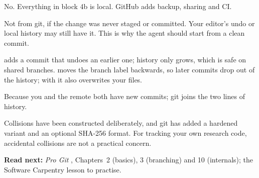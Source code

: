 \begin{qa}
No. Everything in block 4b is local. GitHub adds backup, sharing and CI.

Not from git, if the change was never staged or committed. Your editor's undo or local
history may still have it. This is why the agent should start from a clean commit.

 adds a commit that undoes an earlier one; history only grows, which is safe
on shared branches.  moves the branch label backwards, so later commits drop
out of the history; with  it also overwrites your files.

Because you and the remote both have new commits; git joins the two lines of history.

Collisions have been constructed deliberately, and git has added a hardened variant and an
optional SHA-256 format. For tracking your own research code, accidental collisions are
not a practical concern.
\end{qa}

\textbf{Read next:} \emph{Pro Git} , Chapters~2 (basics), 3 (branching) and
10 (internals); the Software Carpentry lesson  to practise.
